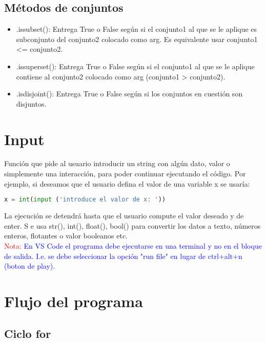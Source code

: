 \documentclass[10pt,oneside]{article}
\begin{document}
\begin{multicols}{2}
        \subsection{Métodos de conjuntos}

        \begin{itemize}
            \item .issubset(): Entrega True o False según si el conjunto1 al que se le aplique es subconjunto del conjunto2 colocado como arg. Es equivalente usar conjunto1 <= conjunto2.
            \item .issuperset(): Entrega True o False según si el conjunto1 al que se le aplique contiene al conjunto2 colocado como arg (conjunto1 > conjunto2).
            \item .isdisjoint(): Entrega True o False según si los conjuntos en cuestión son disjuntos.
        \end{itemize}

        
        \section{Input}

            Función que pide al usuario introducir un string con algún dato, valor o simplemente una interacción, para poder continuar ejecutando el código. Por ejemplo, si deseamos que el usuario defina el valor de una variable x se usaría:

            \begin{lstlisting}[language=Python]
x = int(input ('introduce el valor de x: '))

            \end{lstlisting}

            La ejecución se detendrá hasta que el usuario compute el valor deseado y de enter. S e usa str(), int(), float(), bool() para convertir los datos a texto, números enteros, flotantes o valor booleanos etc.\\\newline \textcolor{red}{Nota:} \textcolor{blue}{En VS Code el programa debe ejecutarse en una terminal y no en el bloque de salida. I.e. se debe seleccionar la opción "run file" en lugar de ctrl+alt+n (boton de play).}
        
        \section{Flujo del programa}

            \subsection{Ciclo for}


\end{multicols}
\end{document}
